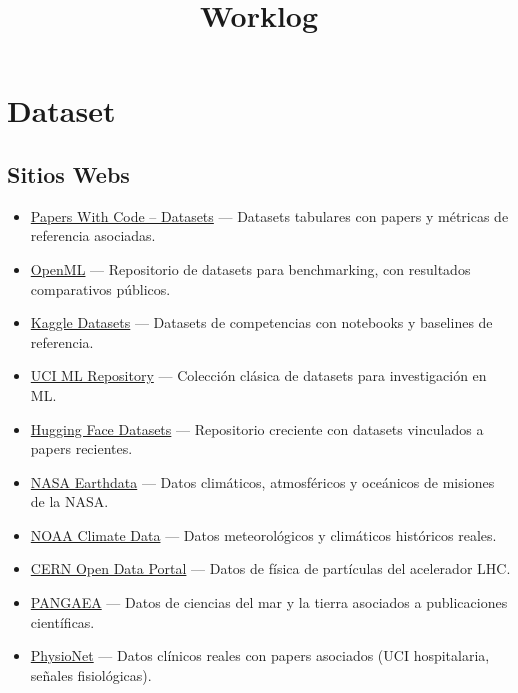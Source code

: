 \documentclass{article}
\begin{document}
\title{Worklog}
\date{}

\maketitle

\section{Dataset}

\subsection{Sitios Webs}

\begin{itemize}
    \item \href{https://paperswithcode.com/datasets?modality=tabular}{Papers With Code – Datasets} — Datasets tabulares con papers y métricas de referencia asociadas.
    \item \href{https://www.openml.org/search?type=data&sort=runs&status=active&id=1489}{OpenML} — Repositorio de datasets para benchmarking, con resultados comparativos públicos.
    \item \href{https://www.kaggle.com/datasets}{Kaggle Datasets} — Datasets de competencias con notebooks y baselines de referencia.
    \item \href{https://archive.ics.uci.edu/}{UCI ML Repository} — Colección clásica de datasets para investigación en ML.
    \item \href{https://huggingface.co/datasets}{Hugging Face Datasets} — Repositorio creciente con datasets vinculados a papers recientes.
    \item \href{https://earthdata.nasa.gov/}{NASA Earthdata} — Datos climáticos, atmosféricos y oceánicos de misiones de la NASA.
    \item \href{https://www.ncei.noaa.gov/}{NOAA Climate Data} — Datos meteorológicos y climáticos históricos reales.
    \item \href{https://opendata.cern.ch/}{CERN Open Data Portal} — Datos de física de partículas del acelerador LHC.
    \item \href{https://www.pangaea.de/}{PANGAEA} — Datos de ciencias del mar y la tierra asociados a publicaciones científicas.
    \item \href{https://physionet.org/}{PhysioNet} — Datos clínicos reales con papers asociados (UCI hospitalaria, señales fisiológicas).

\end{itemize}
\end{document}
